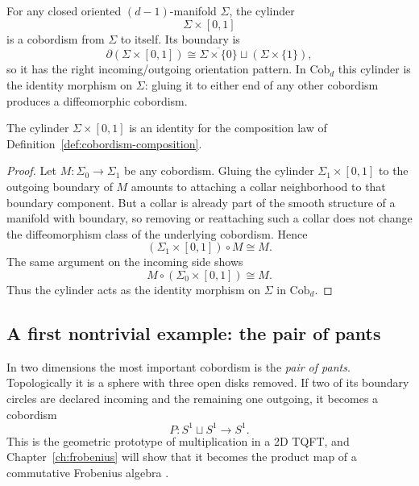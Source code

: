 \begin{example}\label{ex:cylinder-cobordism}
For any closed oriented $(d-1)$-manifold $\Sigma$, the cylinder
\begin{equation}\label{eq:cylinder}
\Sigma \times [0,1]
\end{equation}
is a cobordism from $\Sigma$ to itself. Its boundary is
\begin{equation*}
\partial(\Sigma \times [0,1]) \cong \overline{\Sigma \times \{0\}} \sqcup (\Sigma \times \{1\}),
\end{equation*}
so it has the right incoming/outgoing orientation pattern. In $\mathrm{Cob}_d$ this cylinder is the identity morphism on $\Sigma$: gluing it to either end of any other cobordism produces a diffeomorphic cobordism.
\end{example}

\begin{proposition}\label{prop:cylinder-identity}
The cylinder $\Sigma \times [0,1]$ is an identity for the composition law of Definition~\ref{def:cobordism-composition}.
\end{proposition}

\begin{proof}
Let $M : \Sigma_0 \to \Sigma_1$ be any cobordism. Gluing the cylinder $\Sigma_1 \times [0,1]$ to the outgoing boundary of $M$ amounts to attaching a collar neighborhood to that boundary component. But a collar is already part of the smooth structure of a manifold with boundary, so removing or reattaching such a collar does not change the diffeomorphism class of the underlying cobordism. Hence
\begin{equation*}
(\Sigma_1 \times [0,1]) \circ M \cong M.
\end{equation*}
The same argument on the incoming side shows
\begin{equation*}
M \circ (\Sigma_0 \times [0,1]) \cong M.
\end{equation*}
Thus the cylinder acts as the identity morphism on $\Sigma$ in $\mathrm{Cob}_d$.
\end{proof}

\subsection{A first nontrivial example: the pair of pants}

In two dimensions the most important cobordism is the \emph{pair of pants}. Topologically it is a sphere with three open disks removed. If two of its boundary circles are declared incoming and the remaining one outgoing, it becomes a cobordism
\begin{equation}\label{eq:pair-of-pants-type}
P : S^1 \sqcup S^1 \longrightarrow S^1.
\end{equation}
This is the geometric prototype of multiplication in a 2D TQFT, and Chapter~\ref{ch:frobenius} will show that it becomes the product map of a commutative Frobenius algebra \cite{Kock2004Frobenius}.

